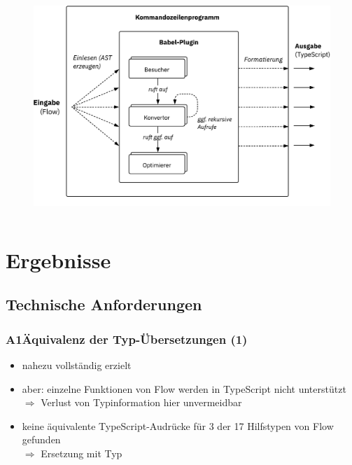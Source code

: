     \begin{frame}
      \vspace{1mm}
      \begin{columns}
        \column{\dimexpr\paperwidth-8mm}
        \begin{figure}
          \includegraphics[width=\textwidth]{src/figures/architecture-overview.pdf}
        \end{figure}
      \end{columns}
    \end{frame}

  \section{Ergebnisse}

    \subsection{Technische Anforderungen}
      \begin{frame}
        \frametitle{A1\hspace{0.75em}Äquivalenz der Typ-Übersetzungen (1)}
        \begin{itemize}
          \item nahezu vollständig erzielt
          \item aber: einzelne Funktionen von Flow werden in TypeScript nicht unterstützt\\
            \smallskip
            $\Rightarrow$ Verlust von Typinformation hier unvermeidbar
          \item keine äquivalente TypeScript-Audrücke für 3 der 17 Hilfstypen von Flow gefunden\\
            \smallskip
            $\Rightarrow$ Ersetzung mit Typ 
        \end{itemize}
      \end{frame}

